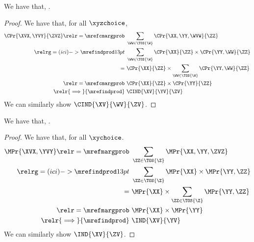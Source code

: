 \begin{proposition}
  We have that, \inddecompdefa.%
\end{proposition}

\begin{proof}
  We have that, for all $\xyzchoice$,
  \begin{align*}
    \CPr{\XVX, \YVY}{\ZVZ} \relr = {\mrefcmargprob}  &\ \sum_{\WW \in \TOS{\W}}\CPr{\XX,\YY,\WVW}{\ZZ}\\
    \relrg = {(ici)->\mrefindprod} 13pt &\ \sum_{\WW \in \TOS{\W}}\CPr{\XX}{\ZZ}\times\CPr{\YY,\WW}{\ZZ}\\
    = &\ \CPr{\XX}{\ZZ}\times\sum_{\WW \in \TOS{\W}}\CPr{\YY,\WW}{\ZZ}\\
    \relr = {\mrefcmargprob} &\ \CPr{\XX}{\ZZ}\times\CPr{\YY}{\ZZ}\\
    \relr {\implies} {\mrefindprod} &\ \CIND{\XV}{\YV}{\ZV}\\
  \end{align*}
  We can similarly show $\CIND{\XV}{\WV}{\ZV}$.
\end{proof}

\begin{proposition}
  We have that, \inddecompdefb.%
\end{proposition}

\begin{proof}
  We have that, for all $\xychoice$.
  \begin{align*}
    \MPr{\XVX, \YVY} \relr = {\mrefmargprob}  &\ \sum_{\ZZ \in \TOS{\Z}}\MPr{\XX,\YY,\ZVZ}\\
    \relrg = {(ici)->\mrefindprod} 13pt &\ \sum_{\ZZ \in \TOS{\Z}}\MPr{\XX}\times\MPr{\YY,\ZZ}\\
    = &\ \MPr{\XX}\times\sum_{\ZZ \in \TOS{\Z}}\MPr{\YY,\ZZ}\\
    \relr = {\mrefmargprob} &\ \MPr{\XX}\times\MPr{\YY}\\
    \relr {\implies} {\mrefindprod} &\ \IND{\XV}{\YV}\\
  \end{align*}
  We can similarly show $\IND{\XV}{\ZV}$.
\end{proof}
